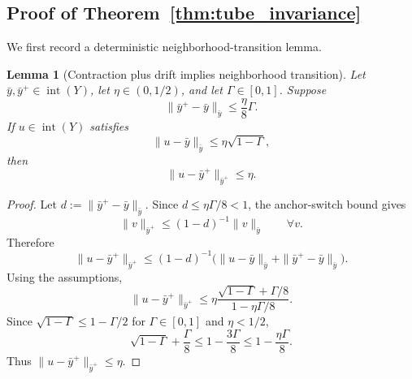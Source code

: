 \documentclass{article}
\newtheorem{lemma}{Lemma}
\begin{document}
\subsection{Proof of Theorem~\ref{thm:tube_invariance}}
\label{app:proof_tube_invariance}

We first record a deterministic neighborhood-transition lemma.

\begin{lemma}[Contraction plus drift implies neighborhood transition]
\label{lem:contraction_plus_drift_tube}
Let \(\bar y,\bar y^+\in\operatorname{int}(Y)\), let \(\eta\in(0,1/2)\), and let
\(\Gamma\in[0,1]\). Suppose
\[
\|\bar y^+-\bar y\|_{\bar y}\le \frac{\eta}{8}\Gamma.
\]
If \(u\in\operatorname{int}(Y)\) satisfies
\[
\|u-\bar y\|_{\bar y}\le \eta\sqrt{1-\Gamma},
\]
then
\[
\|u-\bar y^+\|_{\bar y^+}\le \eta.
\]
\end{lemma}

\begin{proof}
Let \(d:=\|\bar y^+-\bar y\|_{\bar y}\). Since \(d\le \eta\Gamma/8<1\), the anchor-switch bound gives
\[
\|v\|_{\bar y^+}\le (1-d)^{-1}\|v\|_{\bar y}
\qquad \forall v.
\]
Therefore
\[
\|u-\bar y^+\|_{\bar y^+}
\le
(1-d)^{-1}\bigl(\|u-\bar y\|_{\bar y}+\|\bar y^+-\bar y\|_{\bar y}\bigr).
\]
Using the assumptions,
\[
\|u-\bar y^+\|_{\bar y^+}
\le
\eta\frac{\sqrt{1-\Gamma}+\Gamma/8}{1-\eta\Gamma/8}.
\]
Since \(\sqrt{1-\Gamma}\le 1-\Gamma/2\) for \(\Gamma\in[0,1]\) and \(\eta<1/2\),
\[
\sqrt{1-\Gamma}+\frac{\Gamma}{8}
\le
1-\frac{3\Gamma}{8}
\le
1-\frac{\eta\Gamma}{8}.
\]
Thus \(\|u-\bar y^+\|_{\bar y^+}\le\eta\).
\end{proof}
\end{document}
